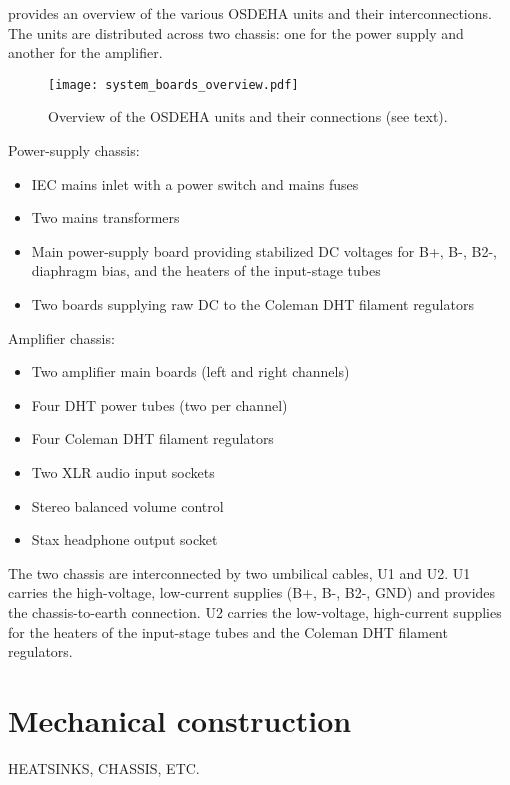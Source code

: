  provides an overview of the various OSDEHA units and their interconnections. The units are distributed across two chassis: one for the power supply and another for the amplifier.

\begin{figure}
\begin{center}
\texttt{[image: system\_boards\_overview.pdf]}
\caption{Overview of the OSDEHA units and their connections (see text).}
\end{center}
\end{figure}

Power-supply chassis:
\begin{itemize}
\item IEC mains inlet with a power switch and mains fuses
\item Two mains transformers
\item Main power-supply board providing stabilized DC voltages for B+, B-, B2-, diaphragm bias, and the heaters of the input-stage tubes
\item Two boards supplying raw DC to the Coleman DHT filament regulators
\end{itemize}

Amplifier chassis:
\begin{itemize}
\item Two amplifier main boards (left and right channels)
\item Four DHT power tubes (two per channel)
\item Four Coleman DHT filament regulators
\item Two XLR audio input sockets
\item Stereo balanced volume control
\item Stax headphone output socket
\end{itemize}

The two chassis are interconnected by two umbilical cables, U1 and U2. U1 carries the high-voltage, low-current supplies (B+, B-, B2-, GND) and provides the chassis-to-earth connection. U2 carries the low-voltage, high-current supplies for the heaters of the input-stage tubes and the Coleman DHT filament regulators.


\section{Mechanical construction}

HEATSINKS, CHASSIS, ETC.

